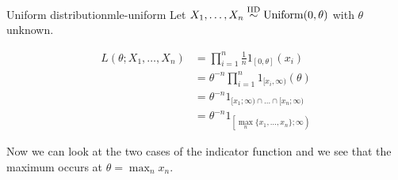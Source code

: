 \documentclass[12pt]{extarticle}
\newcommand{\Uniform}{{\operatorfont Uniform}}
\begin{document}
\begin{example}{Uniform distribution}{mle-uniform}
    Let $X_1, \dots, X_n \stackrel{\text{IID}}{\sim} \Uniform(0,\theta)$ with $\theta$ unknown.

    \begin{align}
        L(\theta; X_1, \dots, X_n) & = \prod_{i = 1}^n \frac{1}{n} 1_{[0, \theta]}(x_i)                \\
                                   & =\theta^{-n} \prod_{i = 1}^n 1_{[x_i, \infty)} (\theta)           \\ %
                                   & = \theta^{-n} 1_{[x_1; \infty) \cap \dots \cap [x_n; \infty)}     \\
                                   & = \theta^{-n} 1_{\left[\max_n \{x_1, \dots, x_n\}; \infty\right)}
    \end{align}

    Now we can look at the two cases of the indicator function and we see that the maximum occurs at $\hat \theta = \max_n x_n$.
\end{example}
\end{document}
